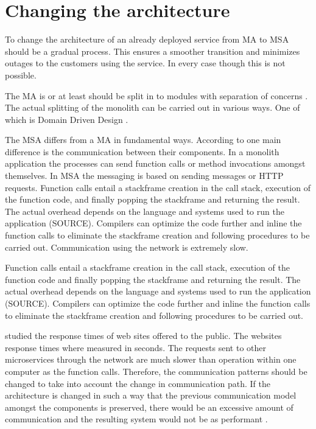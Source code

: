 \section{Changing the architecture}
\begin{sloppypar}
    To change the architecture of an already deployed service from MA to MSA 
    should be a gradual process. This ensures a smoother transition and minimizes 
    outages to the customers using the service. In every case though this is not 
    possible.
\end{sloppypar}
\begin{sloppypar}
    The MA is or at least should be split in to modules with separation of 
    concerns \citep{secchalmsa}. The actual splitting of the monolith can be 
    carried out in various ways. One of which is Domain Driven Design 
    \citep{newman2019}.
\end{sloppypar}
\begin{sloppypar}
    The MSA differs from a MA in fundamental ways. According to 
    \citet{fowlerlewisms} one main difference is the communication between 
    their components. In a monolith application the processes can send function 
    calls or method invocations amongst themselves. In MSA the messaging is 
    based on sending messages or HTTP requests. Function calls entail a 
    stackframe creation in the call stack, execution of the function code, and 
    finally popping the stackframe and returning the result. The actual overhead 
    depends on the language and systems used to run the application (SOURCE). 
    Compilers can optimize the code further and inline the function calls to 
    eliminate the stackframe creation and following procedures to be carried out. 
    Communication using the network is extremely slow.
\end{sloppypar}
\begin{sloppypar}
    Function calls entail a stackframe creation in the call stack, execution of 
    the function code and finally popping the stackframe and returning the result. 
    The actual overhead depends on the language and systems used to run the 
    application (SOURCE). Compilers can optimize the code further and inline 
    the function calls to eliminate the stackframe creation and following 
    procedures to be carried out.
\end{sloppypar}
\begin{sloppypar}    
    \citet{webdelays} studied the response times of web sites offered to the 
    public. The websites response times where measured in seconds. The requests 
    sent to other microservices through the network are much slower than 
    operation within one computer as the function calls. Therefore, the 
    communication patterns should be changed to take into account the change in 
    communication path. If the architecture is changed in such a way that the 
    previous communication model amongst the components is preserved, there 
    would be an excessive amount of communication and the resulting system 
    would not be as performant \citep{fowlerlewisms}.
\end{sloppypar}

